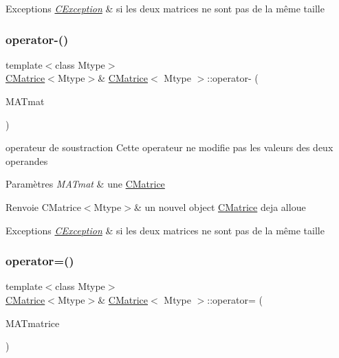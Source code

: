 \begin{DoxyExceptions}{Exceptions}
{\em \hyperlink{classCException}{C\+Exception}} & si les deux matrices ne sont pas de la même taille \\
\hline
\end{DoxyExceptions}
\mbox{\label{classCMatrice_ad5af8be8cab62aa02e3431774f1e69b2}} 
\subsubsection{\texorpdfstring{operator-\/()}{operator-()}}
{\footnotesize\ttfamily template$<$class Mtype$>$ \\
\hyperlink{classCMatrice}{C\+Matrice}$<$Mtype$>$\& \hyperlink{classCMatrice}{C\+Matrice}$<$ Mtype $>$\+::operator-\/ (\begin{DoxyParamCaption}\item[{\hyperlink{classCMatrice}{C\+Matrice}$<$ Mtype $>$ \&}]{M\+A\+Tmat }\end{DoxyParamCaption})\hspace{0.3cm}{\ttfamily [inline]}}



operateur de soustraction Cette operateur ne modifie pas les valeurs des deux operandes 


\begin{DoxyParams}{Paramètres}
{\em M\+A\+Tmat} & une \hyperlink{classCMatrice}{C\+Matrice} \\
\hline
\end{DoxyParams}
\begin{DoxyReturn}{Renvoie}
C\+Matrice$<$\+Mtype$>$\& un nouvel object \hyperlink{classCMatrice}{C\+Matrice} deja alloue 
\end{DoxyReturn}

\begin{DoxyExceptions}{Exceptions}
{\em \hyperlink{classCException}{C\+Exception}} & si les deux matrices ne sont pas de la même taille \\
\hline
\end{DoxyExceptions}
\mbox{\label{classCMatrice_afe427d425d3204c25faf865d5ba1ef09}} 
\subsubsection{\texorpdfstring{operator=()}{operator=()}}
{\footnotesize\ttfamily template$<$class Mtype$>$ \\
\hyperlink{classCMatrice}{C\+Matrice}$<$Mtype$>$\& \hyperlink{classCMatrice}{C\+Matrice}$<$ Mtype $>$\+::operator= (\begin{DoxyParamCaption}\item[{\hyperlink{classCMatrice}{C\+Matrice}$<$ Mtype $>$}]{M\+A\+Tmatrice }\end{DoxyParamCaption})\hspace{0.3cm}{\ttfamily [inline]}}



